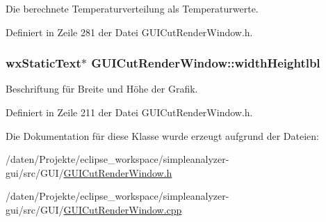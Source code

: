 Die berechnete Temperaturverteilung als Temperaturwerte. 



Definiert in Zeile 281 der Datei G\-U\-I\-Cut\-Render\-Window.\-h.

\hypertarget{classGUICutRenderWindow_a26632978654028e6fbfaa6eef704ff06}{
\subsubsection[{width\-Heightlbl}]{\setlength{\rightskip}{0pt plus 5cm}wx\-Static\-Text$\ast$ G\-U\-I\-Cut\-Render\-Window\-::width\-Heightlbl\hspace{0.3cm}{\ttfamily [private]}}}\label{classGUICutRenderWindow_a26632978654028e6fbfaa6eef704ff06}


Beschriftung für Breite und Höhe der Grafik. 



Definiert in Zeile 211 der Datei G\-U\-I\-Cut\-Render\-Window.\-h.



Die Dokumentation für diese Klasse wurde erzeugt aufgrund der Dateien\-:\begin{DoxyCompactItemize}
\item 
/daten/\-Projekte/eclipse\-\_\-workspace/simpleanalyzer-\/gui/src/\-G\-U\-I/\hyperlink{GUICutRenderWindow_8h}{G\-U\-I\-Cut\-Render\-Window.\-h}\item 
/daten/\-Projekte/eclipse\-\_\-workspace/simpleanalyzer-\/gui/src/\-G\-U\-I/\hyperlink{GUICutRenderWindow_8cpp}{G\-U\-I\-Cut\-Render\-Window.\-cpp}\end{DoxyCompactItemize}
